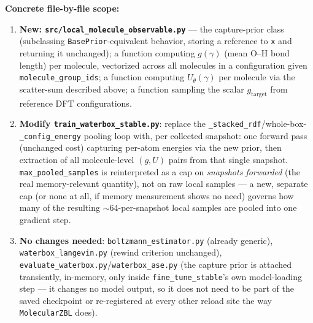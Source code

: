 \documentclass[11pt]{article}
\begin{document}
\textbf{Concrete file-by-file scope:}
\begin{enumerate}
  \item \textbf{New: \texttt{src/local\_molecule\_observable.py}} --- the
  capture-prior class (subclassing \texttt{BasePrior}-equivalent behavior,
  storing a reference to \texttt{x} and returning it unchanged); a function
  computing $g(\gamma)$ (mean O--H bond length) per molecule, vectorized
  across all molecules in a configuration given \texttt{molecule\_group\_ids};
  a function computing $U_\theta(\gamma)$ per molecule via the scatter-sum
  described above; a function sampling the scalar $g_{\text{target}}$ from
  reference DFT configurations.
  \item \textbf{Modify \texttt{train\_waterbox\_stable.py}}: replace the
  \texttt{\_stacked\_rdf}/whole-box-\texttt{\_config\_energy} pooling loop
  with, per collected snapshot: one forward pass (unchanged cost) capturing
  per-atom energies via the new prior, then extraction of all
  molecule-level $(g,U)$ pairs from that single snapshot.
  \texttt{max\_pooled\_samples} is reinterpreted as a cap on
  \emph{snapshots forwarded} (the real memory-relevant quantity), not on
  raw local samples --- a new, separate cap (or none at all, if memory
  measurement shows no need) governs how many of the resulting
  $\sim$64-per-snapshot local samples are pooled into one gradient step.
  \item \textbf{No changes needed}: \texttt{boltzmann\_estimator.py}
  (already generic), \texttt{waterbox\_langevin.py} (rewind criterion
  unchanged), \texttt{evaluate\_waterbox.py}/\texttt{waterbox\_ase.py}
  (the capture prior is attached transiently, in-memory, only inside
  \texttt{fine\_tune\_stable}'s own model-loading step --- it changes no
  model output, so it does not need to be part of the saved checkpoint or
  re-registered at every other reload site the way \texttt{MolecularZBL}
  does).
\end{enumerate}
\end{document}
